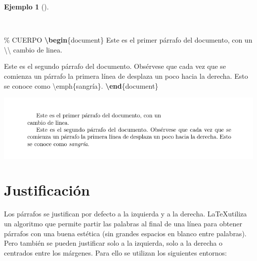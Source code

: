 \documentclass[
  a4paper,
]{scrreport}
\newenvironment{Shaded}{\begin{snugshade}}{\end{snugshade}}
\newcommand{\CommentTok}[1]{\textcolor[rgb]{0.37,0.37,0.37}{#1}}
\newcommand{\ExtensionTok}[1]{\textcolor[rgb]{0.00,0.23,0.31}{#1}}
\newcommand{\FunctionTok}[1]{\textcolor[rgb]{0.28,0.35,0.67}{#1}}
\newcommand{\KeywordTok}[1]{\textcolor[rgb]{0.00,0.23,0.31}{\textbf{#1}}}
\newcommand{\NormalTok}[1]{\textcolor[rgb]{0.00,0.23,0.31}{#1}}
\theoremstyle{definition}
\newtheorem{example}{Ejemplo}[chapter]
\theoremstyle{remark}
\begin{document}
\begin{example}[]\protect\hypertarget{exm-parrafos}{}\label{exm-parrafos}

~

\begin{Shaded}
\begin{Highlighting}[]
\CommentTok{\% CUERPO}
\KeywordTok{\textbackslash{}begin}\NormalTok{\{}\ExtensionTok{document}\NormalTok{\}}
\NormalTok{Este es el primer párrafo del documento, con un }\FunctionTok{\textbackslash{}\textbackslash{}}
\NormalTok{cambio de linea.}

\NormalTok{Este es el segundo párrafo del documento. Obsérvese que cada vez que se }
\NormalTok{comienza un párrafo la primera línea de desplaza un poco hacia la derecha. }
\NormalTok{Esto se conoce como }\FunctionTok{\textbackslash{}emph}\NormalTok{\{sangría\}.}
\KeywordTok{\textbackslash{}end}\NormalTok{\{}\ExtensionTok{document}\NormalTok{\}}
\end{Highlighting}
\end{Shaded}

\begin{tcolorbox}[enhanced jigsaw, colframe=quarto-callout-note-color-frame, opacityback=0, title={Salida}, bottomrule=.15mm, left=2mm, coltitle=black, arc=.35mm, leftrule=.75mm, colback=white, rightrule=.15mm, colbacktitle=quarto-callout-note-color!10!white, toprule=.15mm, breakable, opacitybacktitle=0.6, bottomtitle=1mm, toptitle=1mm, titlerule=0mm]

\includegraphics{img/secciones/parrafos.png}

\end{tcolorbox}

\end{example}

\section{Justificación}\label{justificaciuxf3n}

Los párrafos se justifican por defecto a la izquierda y a la derecha.
\LaTeX utiliza un algoritmo que permite partir las palabras al final de
una línea para obtener párrafos con una buena estética (sin grandes
espacios en blanco entre palabras). Pero también se pueden justificar
solo a la izquierda, solo a la derecha o centrados entre los márgenes.
Para ello se utilizan los siguientes entornos:
\end{document}
